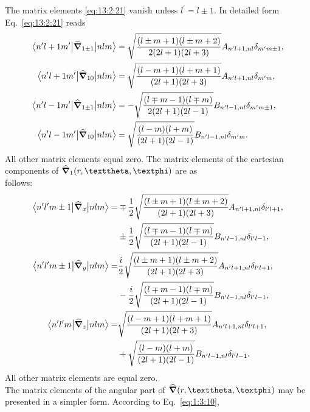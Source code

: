 The matrix elements \eqref{eq:13:2:21} vanish unless \(l^{\prime}=l \pm 1\). In detailed form Eq.~\eqref{eq:13:2:21} reads
\begin{align}
\bigl\langle  n^{\prime} l+1 m^{\prime} \big|  \widehat{\boldsymbol{\nabla}}_{1 \pm 1} \big| n l m \bigr\rangle & =\sqrt{\frac{(l \pm m+1)(l \pm m+2)}{2(2 l+1)(2 l+3)}} A_{n^{\prime} l+1, n l} \delta_{m^{\prime} m \pm 1}, \notag\\
\bigl\langle  n^{\prime} l+1 m^{\prime} \big|  \widehat{\boldsymbol{\nabla}}_{10} \big| n l m \bigr\rangle & =\sqrt{\frac{(l-m+1)(l+m+1)}{(2 l+1)(2 l+3)}} A_{n^{\prime} l+1, n l} \delta_{m^{\prime} m}, \notag\\
\bigl\langle  n^{\prime} l-1 m^{\prime} \big|  \widehat{\boldsymbol{\nabla}}_{1 \pm 1} \big| n l m \bigr\rangle & =-\sqrt{\frac{(l \mp m-1)(l \mp m)}{2(2 l+1)(2 l-1)}} B_{n^{\prime} l-1, n l} \delta_{m^{\prime} m \pm 1},  \label{eq:13:2:24}\\
\bigl\langle  n^{\prime} l-1 m^{\prime} \big|  \widehat{\boldsymbol{\nabla}}_{10} \big| n l m \bigr\rangle & =\sqrt{\frac{(l-m)(l+m)}{(2 l+1)(2 l-1)}} B_{n^{\prime} l-1, n l} \delta_{m^{\prime} m}. \notag
\end{align}
All other matrix elements equal zero. The matrix elements of the cartesian components of \(\delop_{1}(r, \vartheta, \varphi)\) are as\\
follows:
\begin{align}
\bigl\langle  n^{\prime} l^{\prime} m \pm 1 \big|  \widehat{\boldsymbol{\nabla}}_{x} \big| n l m \bigr\rangle= & \mp \frac{1}{2} \sqrt{\frac{(l \pm m+1)(l \pm m+2)}{(2 l+1)(2 l+3)}} A_{n^{\prime} l+1, n l} \delta_{l^{\prime} l+1},\notag \\
& \pm \frac{1}{2} \sqrt{\frac{(l \mp m-1)(l \mp m)}{(2 l+1)(2 l-1)}} B_{n^{\prime} l-1, n l} \delta_{l^{\prime} l-1}, \notag \\
\bigl\langle  n^{\prime} l^{\prime} m \pm 1 \big|  \widehat{\boldsymbol{\nabla}}_{y} \big| n l m \bigr\rangle= & \frac{i}{2} \sqrt{\frac{(l \pm m+1)(l \pm m+2)}{(2 l+1)(2 l+3)}} A_{n^{\prime} l+1, n l} \delta_{l^{\prime} l+1}, \notag\\
& -\frac{i}{2} \sqrt{\frac{(l \mp m-1)(l \mp m)}{(2 l+1)(2 l-1)}} B_{n^{\prime} l-1, n l} \delta_{l^{\prime} l-1}, \label{eq:13:2:25}\\
\bigl\langle  n^{\prime} l^{\prime} m \big|  \widehat{\boldsymbol{\nabla}}_{z} \big| n l m \bigr\rangle= & \sqrt{\frac{(l-m+1)(l+m+1)}{(2 l+1)(2 l+3)}} A_{n^{\prime} l+1, n l} \delta_{l^{\prime} l+1}, \notag\\
& +\sqrt{\frac{(l-m)(l+m)}{(2 l+1)(2 l-1)}} B_{n^{\prime} l-1, n l} \delta_{l^{\prime} l-1}. \notag
\end{align}
All other matrix elements are equal zero.\\
The matrix elements of the angular part of \(\delop(r, \vartheta, \varphi)\) may be presented in a simpler form. According to Eq.~\eqref{eq:1:3:10},
